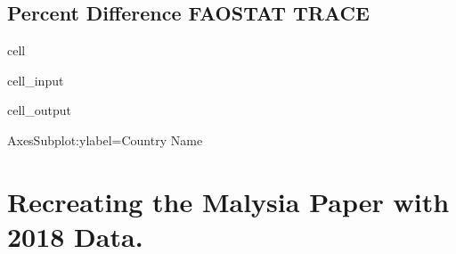 \documentclass[letterpaper,10pt,english]{jupyterBook}
\begin{document}
\subsection{Percent Difference FAOSTAT \sphinxhyphen{} TRACE}
\label{\detokenize{notebooks/replicating_paper:percent-difference-faostat-trace}}
\begin{sphinxuseclass}{cell}\begin{sphinxVerbatimInput}

\begin{sphinxuseclass}{cell_input}
\begin{sphinxVerbatim}[commandchars=\\\{\}]
        \PYG{p}{[}\PYG{p}{]}       
\end{sphinxVerbatim}

\end{sphinxuseclass}\end{sphinxVerbatimInput}
\begin{sphinxVerbatimOutput}

\begin{sphinxuseclass}{cell_output}
\begin{sphinxVerbatim}[commandchars=\\\{\}]
\PYGZlt{}AxesSubplot:ylabel=\PYGZsq{}Country Name\PYGZsq{}\PYGZgt{}
\end{sphinxVerbatim}

\noindent{}

\end{sphinxuseclass}\end{sphinxVerbatimOutput}

\end{sphinxuseclass}

\section{Recreating the Malysia Paper with 2018 Data.}
\label{\detokenize{notebooks/replicating_paper:recreating-the-malysia-paper-with-2018-data}}
\end{document}
